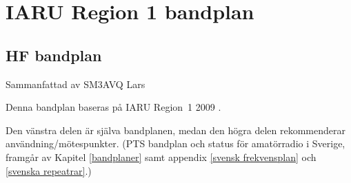 \chapter{IARU Region 1 bandplan}
\label{IARU bandplan}

\section{HF bandplan}

Sammanfattad av SM3AVQ Lars

Denna bandplan baseras på IARU Region~1 2009 \cite{IARU1}.


Den vänstra delen är själva bandplanen, medan den högra delen rekommenderar användning/mötespunkter.
(PTS bandplan och status för amatörradio i Sverige, framgår av Kapitel \ref{bandplaner} samt appendix \ref{svensk frekvensplan} och \ref{svenska repeatrar}.)

